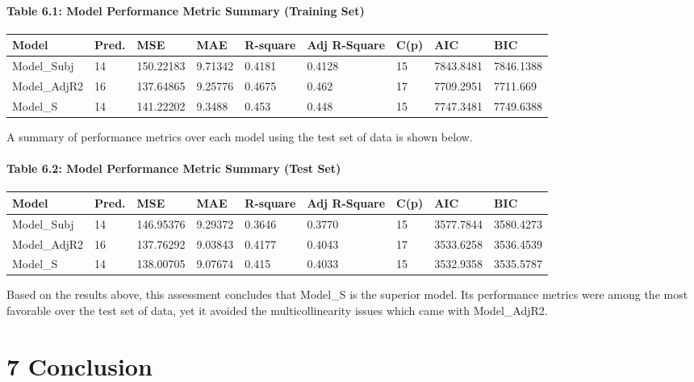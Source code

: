 \documentclass[]{article}
\let\oldparagraph\paragraph
\renewcommand{\paragraph}[1]{\oldparagraph{#1}\mbox{}}
\begin{document}
\paragraph{Table 6.1: Model Performance Metric Summary (Training
Set)}\label{table-6.1-model-performance-metric-summary-training-set}

\begin{longtable}[]{@{}lllllllll@{}}
\toprule
Model & Pred. & MSE & MAE & R-square & Adj R-Square & C(p) & AIC &
BIC\tabularnewline
\midrule
\endhead
Model\_Subj & 14 & 150.22183 & 9.71342 & 0.4181 & 0.4128 & 15 &
7843.8481 & 7846.1388\tabularnewline
Model\_AdjR2 & 16 & 137.64865 & 9.25776 & 0.4675 & 0.462 & 17 &
7709.2951 & 7711.669\tabularnewline
Model\_S & 14 & 141.22202 & 9.3488 & 0.453 & 0.448 & 15 & 7747.3481 &
7749.6388\tabularnewline
\bottomrule
\end{longtable}

A summary of performance metrics over each model using the test set of
data is shown below.

\paragraph{Table 6.2: Model Performance Metric Summary (Test
Set)}\label{table-6.2-model-performance-metric-summary-test-set}

\begin{longtable}[]{@{}lllllllll@{}}
\toprule
Model & Pred. & MSE & MAE & R-square & Adj R-Square & C(p) & AIC &
BIC\tabularnewline
\midrule
\endhead
Model\_Subj & 14 & 146.95376 & 9.29372 & 0.3646 & 0.3770 & 15 &
3577.7844 & 3580.4273\tabularnewline
Model\_AdjR2 & 16 & 137.76292 & 9.03843 & 0.4177 & 0.4043 & 17 &
3533.6258 & 3536.4539\tabularnewline
Model\_S & 14 & 138.00705 & 9.07674 & 0.415 & 0.4033 & 15 & 3532.9358 &
3535.5787\tabularnewline
\bottomrule
\end{longtable}

Based on the results above, this assessment concludes that Model\_S is
the superior model. Its performance metrics were among the most
favorable over the test set of data, yet it avoided the
multicollinearity issues which came with Model\_AdjR2.

\section{7 Conclusion}\label{conclusion}
\end{document}
